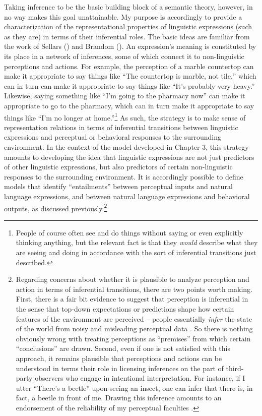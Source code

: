 Taking inference to be the basic building block of a semantic theory, however, in no way makes this goal unattainable. My purpose is accordingly to provide a characterization of the representational properties of linguistic expressions (such as they are) in terms of their inferential roles. The basic ideas are familiar from the work of Sellars (\citeyear{Sellars:1953,Sellars:1954}) and Brandom (\citeyear{Brandom:2000,Brandom:1994}). An expression's meaning is constituted by its place in a network of inferences, some of which connect it to non-linguistic perceptions and actions. For example, the perception of a marble countertop can make it appropriate to say things like ``The countertop is marble, not tile,'' which can in turn can make it appropriate to say things like ``It's probably very heavy.'' Likewise, saying something like ``I'm going to the pharmacy now'' can make it appropriate to go to the pharmacy, which can in turn make it appropriate to say things like ``I'm no longer at home.''\footnote{People of course often see and do things without saying or even explicitly thinking anything, but the relevant fact is that they \textit{would} describe what they are seeing and doing in accordance with the sort of inferential transitions just described.} As such, the strategy is to make sense of representation relations in terms of inferential transitions between linguistic expressions and perceptual or behavioral responses to the surrounding environment. In the context of the model developed in Chapter 3, this strategy amounts to developing the idea that linguistic expressions are not just predictors of other linguistic expressions, but also predictors of certain non-linguistic responses to the surrounding environment. It is accordingly possible to define models that identify ``entailments'' between perceptual inputs and natural language expressions, and between natural language expressions and behavioral outputs, as discussed previously.\footnote{Regarding concerns about whether it is plausible to analyze perception and action in terms of inferential transitions, there are two points worth making. First, there is a fair bit evidence to suggest that perception is inferential in the sense that top-down expectations or predictions shape how certain features of the environment are perceived -- people essentially \textit{infer} the state of the world from noisy and misleading perceptual data \citep{clark:2013,Lupyan:2015}. So there is nothing obviously wrong with treating perceptions as ``premises'' from which certain ``conclusions'' are drawn. Second, even if one is not satisfied with this approach, it remains plausible that perceptions and actions can be understood in terms their role in licensing inferences on the part of third-party observers who engage in intentional interpretation. For instance, if I utter ``There's a beetle'' upon seeing an insect, one can infer that there is, in fact, a beetle in front of me. Drawing this inference amounts to an endorsement of the reliability of my perceptual faculties \citep{Brandom:1994,Brandom:2009}.}
	
